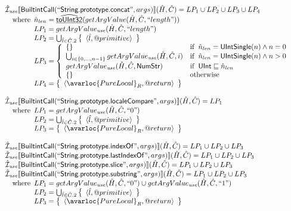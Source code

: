 \[\begin{array}{l}
\aI_{\it use}\lbr \SF{BuiltintCall}(``\SF{String.prototype.concat}",args)\rbr(\hat{H},\hat{C}) = LP_1 \cup LP_2 \cup LP_3 \cup LP_4\\
\quad\wherec{
  \hat{n}_{len} = \ahf{toUInt32}(getArgValue(\hat{H}, \hat{C}, ``length"))\\
  LP_1 = getArgValue_{\it use}(\hat{H}, \hat{C}, ``length")\\
  LP_2 = \bigcup_{\hat{l} \in \hat{C}.2} \set{\langle \hat{l},\varprop{primitive} \rangle}\\
  LP_3 = \left\{\begin{array}{ll}
      \set{}
      & \ifc{\hat{n}_{len} = \SF{UIntSingle}(n) \land n = 0}\\
      \bigcup_{i \in \{0,...,n-1\} } getArgValue_{\it use}(\hat{H}, \hat{C}, i)
      & \ifc{\hat{n}_{len} = \SF{UIntSingle}(n) \land n > 0}\\
      getArgValue_{\it use}(\hat{H}, \hat{C}, \SF{NumStr})
      & \ifc{\SF{UInt} \sqsubseteq \hat{n}_{len}}\\
      \set{} & \owc
    \end{array}\right.\\
  LP_4 = \set{\langle\avarloc{PureLocal}_R,\varprop{return}\rangle}\\
  }\\
\\

\aI_{\it use}\lbr \SF{BuiltintCall}(``\SF{String.prototype.localeCompare}",args)\rbr(\hat{H},\hat{C}) = LP_1\\
\quad\wherec{
  LP_1 = getArgValue_{\it use}(\hat{H}, \hat{C}, ``0")\\
  LP_2 = \bigcup_{\hat{l} \in \hat{C}.2} \set{\langle \hat{l},\varprop{primitive} \rangle}\\
  LP_3 = \set{\langle\avarloc{PureLocal}_R,\varprop{return}\rangle}\\
  }\\
\\


\aI_{\it use}\lbr \SF{BuiltintCall}(``\SF{String.prototype.indexOf}",args)\rbr(\hat{H},\hat{C}) = LP_1 \cup LP_2 \cup LP_3\\
\aI_{\it use}\lbr \SF{BuiltintCall}(``\SF{String.prototype.lastIndexOf}",args)\rbr(\hat{H},\hat{C}) = LP_1 \cup LP_2 \cup LP_3\\
\aI_{\it use}\lbr \SF{BuiltintCall}(``\SF{String.prototype.slice}",args)\rbr(\hat{H},\hat{C}) = LP_1 \cup LP_2 \cup LP_3\\
\aI_{\it use}\lbr \SF{BuiltintCall}(``\SF{String.prototype.substring}",args)\rbr(\hat{H},\hat{C}) = LP_1 \cup LP_2 \cup LP_3\\
\quad\wherec{
  LP_1 = getArgValue_{\it use}(\hat{H}, \hat{C}, ``0") \cup getArgValue_{\it use}(\hat{H}, \hat{C}, ``1")\\
  LP_2 = \bigcup_{\hat{l} \in \hat{C}.2} \set{\langle \hat{l},\varprop{primitive} \rangle}\\
  LP_3 = \set{\langle\avarloc{PureLocal}_R,\varprop{return}\rangle}\\
  }\\
\\


\end{array}\]
